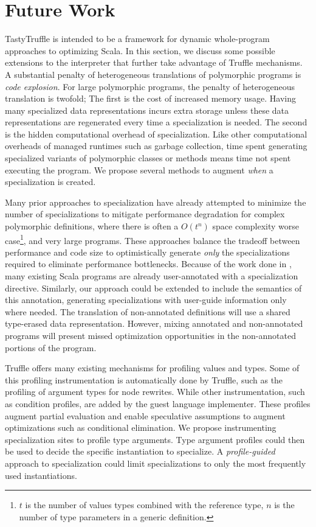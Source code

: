 \chapter{Future Work}

TastyTruffle is intended to be a framework for dynamic whole-program approaches to optimizing Scala.
In this section, we discuss some possible extensions to the interpreter that further take advantage of Truffle mechanisms.
A substantial penalty of heterogeneous translations of polymorphic programs is \textit{code explosion}.
For large polymorphic programs, the penalty of heterogeneous translation is twofold; 
The first is the cost of increased memory usage.
Having many specialized data representations incurs extra storage unless these data representations are regenerated every time a specialization is needed.
The second is the hidden computational overhead of specialization. 
Like other computational overheads of managed runtimes such as garbage collection, time spent generating specialized variants of polymorphic classes or methods means time not spent executing the program.
We propose several methods to augment \textit{when} a specialization is created.

Many prior approaches to specialization have already attempted to minimize the number of specializations to mitigate performance degradation for complex polymorphic definitions, where there is often a \(O(t^n)\) space complexity worse case\footnote{$t$ is the number of values types combined with the reference type, $n$ is the number of type parameters in a generic definition.}, and very large programs.
These approaches balance the tradeoff between performance and code size to optimistically generate \textit{only} the specializations required to eliminate performance bottlenecks.
Because of the work done in \cite{scala:specialization}, many existing Scala programs are already user-annotated with a specialization directive.
Similarly, our approach could be extended to include the semantics of this annotation, generating specializations with user-guide information only where needed.
The translation of non-annotated definitions will use a shared type-erased data representation.
However, mixing annotated and non-annotated programs will present missed optimization opportunities in the non-annotated portions of the program.

Truffle offers many existing mechanisms for profiling values and types.
Some of this profiling instrumentation is automatically done by Truffle, such as the profiling of argument types for node rewrites.
While other instrumentation,  such as condition profiles, are added by the guest language implementer.
These profiles augment partial evaluation and enable speculative assumptions to augment optimizations such as conditional elimination.
We propose instrumenting specialization sites to profile type arguments.
Type argument profiles could then be used to decide the specific instantiation to specialize.
A \textit{profile-guided} approach to specialization could limit specializations to only the most frequently used instantiations.

